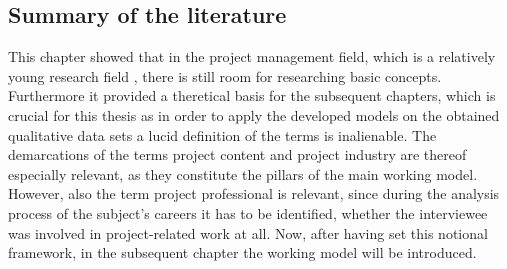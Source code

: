 \subsection{Summary of the literature}
This chapter showed that in the project management field, which is a relatively young research field \cite{Uchitpe16}, there is still room for researching basic concepts. Furthermore it provided a theretical basis for the subsequent chapters, which is crucial for this thesis as in order to apply the developed models on the obtained qualitative data sets a lucid definition of the terms is inalienable. The demarcations of the terms project content and project industry are thereof especially relevant, as they constitute the pillars of the main working model. However, also the term project professional is relevant, since during the analysis process of the subject's careers it has to be identified, whether the interviewee was involved in project-related work at all. Now, after having set this notional framework, in the subsequent chapter the working model will be introduced.

